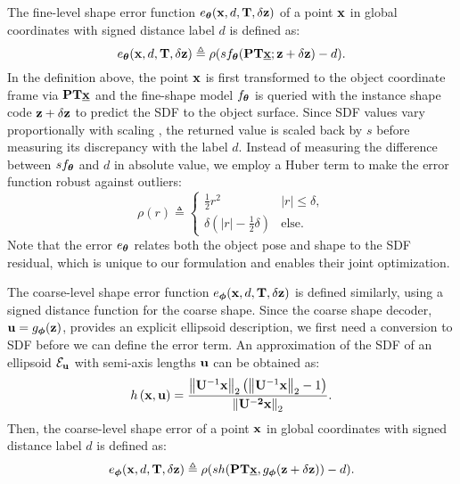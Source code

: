 The fine-level shape error function $e_{\boldsymbol{\theta}}(\mathbf{x},d,\mathbf{T},\delta\mathbf{z})$ of a point $\mathbf{x}$ in global coordinates  with signed distance label $d$ is defined as:
%
\begin{equation}
  \label{eq:e_k}
  e_{\boldsymbol{\theta}}(\mathbf{x},d,\mathbf{T},\delta\mathbf{z}) \triangleq \rho(s f_{\boldsymbol{\theta}}(\mathbf{P}\mathbf{T} \underline{\mathbf{x}}; \mathbf{z}+\delta\mathbf{z}) - d).
\end{equation}
%
In the definition above, the point $\mathbf{x}$ is first transformed to the object coordinate frame via $\mathbf{P}\mathbf{T} \underline{\mathbf{x}}$ and the fine-shape model $f_{\boldsymbol{\theta}}$ is queried with the instance shape code $\mathbf{z} + \delta\mathbf{z}$ to predict the SDF to the object surface. Since SDF values vary proportionally with scaling \cite{afolabi2020extending}, the returned value is scaled back by $s$ before measuring its discrepancy with the label $d$. Instead of measuring the difference between $s f_{\boldsymbol{\theta}}$ and $d$ in absolute value, we employ a Huber term \cite{Huber1964Robust} to make the error function robust against outliers:
%
\begin{equation}
\label{eq:huber_loss}
\rho(r) \triangleq 
\begin{cases}
\frac{1}{2}r^2 & |r|\leq \delta,\\
\delta(|r|-\frac{1}{2}\delta) & \text{else}.
\end{cases}
\end{equation}
%
Note that the error $e_{\boldsymbol{\theta}}$ relates both the object pose and shape to the SDF residual, which is unique to our formulation and enables their joint optimization.

The coarse-level shape error function $e_{\boldsymbol{\phi}}(\mathbf{x},d,\mathbf{T},\delta\mathbf{z})$ is defined similarly, using a signed distance function for the coarse shape. Since the coarse shape decoder, $\mathbf{u} = g_{\boldsymbol{\phi}}(\mathbf{z})$, provides an explicit ellipsoid description, we first need a conversion to SDF before we can define the error term. An approximation of the SDF of an ellipsoid ${\cal E}_{\mathbf{u}}$ with semi-axis lengths $\mathbf{u}$ can be obtained as:
%
\begin{equation}
  \label{eq:ellpsoid_sdf}
  h\left(\mathbf{x}, \mathbf{u}\right)
  =
  \frac{\left\|\mathbf{U}^{-1}\mathbf{x}\right\|_{2}\left(\left\|\mathbf{U}^{-1}\mathbf{x}\right\|_{2}-1\right)}
  {\left\|\bf{U}^{-2}\mathbf{x}\right\|_{2}}.
\end{equation}
%
Then, the coarse-level shape error of a point $\mathbf{x}$ in global coordinates  with signed distance label $d$ is defined as:
%
\begin{equation}
  \label{eq:e_g}
  e_{\boldsymbol{\phi}}(\mathbf{x},d,\mathbf{T},\delta\mathbf{z}) \triangleq \rho(s h(\mathbf{P}\mathbf{T} \underline{\mathbf{x}}, g_{\boldsymbol{\phi}}(\mathbf{z}+\delta\mathbf{z})) - d).
\end{equation} 
%

